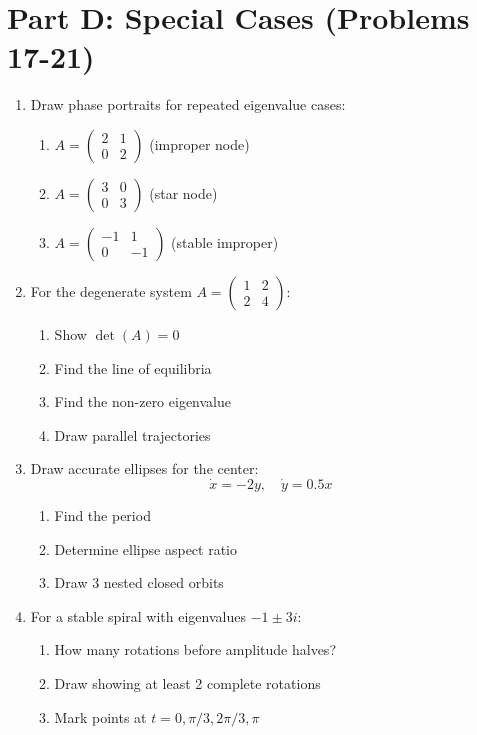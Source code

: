 \documentclass[12pt]{article}
\begin{document}
\section*{Part D: Special Cases (Problems 17-21)}

\begin{enumerate}[resume]
\item Draw phase portraits for repeated eigenvalue cases:
\begin{enumerate}[label=(\alph*)]
    \item $A = \begin{pmatrix} 2 & 1 \\ 0 & 2 \end{pmatrix}$ (improper node)
    \item $A = \begin{pmatrix} 3 & 0 \\ 0 & 3 \end{pmatrix}$ (star node)
    \item $A = \begin{pmatrix} -1 & 1 \\ 0 & -1 \end{pmatrix}$ (stable improper)
\end{enumerate}

\item For the degenerate system $A = \begin{pmatrix} 1 & 2 \\ 2 & 4 \end{pmatrix}$:
\begin{enumerate}[label=(\alph*)]
    \item Show $\det(A) = 0$
    \item Find the line of equilibria
    \item Find the non-zero eigenvalue
    \item Draw parallel trajectories
\end{enumerate}

\item Draw accurate ellipses for the center:
$$\dot{x} = -2y, \quad \dot{y} = 0.5x$$
\begin{enumerate}[label=(\alph*)]
    \item Find the period
    \item Determine ellipse aspect ratio
    \item Draw 3 nested closed orbits
\end{enumerate}

\item For a stable spiral with eigenvalues $-1 \pm 3i$:
\begin{enumerate}[label=(\alph*)]
    \item How many rotations before amplitude halves?
    \item Draw showing at least 2 complete rotations
    \item Mark points at $t = 0, \pi/3, 2\pi/3, \pi$
\end{enumerate}


\end{enumerate}
\end{document}

